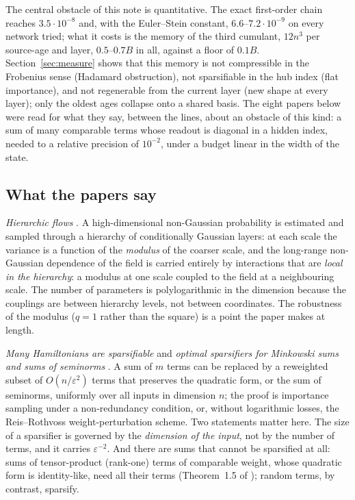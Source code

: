 \label{sec:reading}
The central obstacle of this note is quantitative. The exact first-order chain reaches $3.5\cdot10^{-8}$ and, with
the Euler--Stein constant, $6.6$--$7.2\cdot10^{-9}$ on every network tried; what it costs is the memory of the third
cumulant, $12n^3$ per source-age and layer, $0.5$--$0.7B$ in all, against a floor of $0.1B$. Section~\ref{sec:measure}
shows that this memory is not compressible in the Frobenius sense (Hadamard obstruction), not sparsifiable in the
hub index (flat importance), and not regenerable from the current layer (new shape at every layer); only the
oldest ages collapse onto a shared basis. The eight papers below were read for what they say, between the lines,
about an obstacle of this kind: a sum of many comparable terms whose readout is diagonal in a hidden index, needed
to a relative precision of $10^{-2}$, under a budget linear in the width of the state.

\subsection{What the papers say}
\emph{Hierarchic flows} \cite{LM}. A high-dimensional non-Gaussian probability is estimated and sampled through a
hierarchy of conditionally Gaussian layers: at each scale the variance is a function of the \emph{modulus} of the
coarser scale, and the long-range non-Gaussian dependence of the field is carried entirely by interactions that
are \emph{local in the hierarchy}: a modulus at one scale coupled to the field at a neighbouring scale. The number
of parameters is polylogarithmic in the dimension because the couplings are between hierarchy levels, not between
coordinates. The robustness of the modulus ($q=1$ rather than the square) is a point the paper makes at length.

\emph{Many Hamiltonians are sparsifiable} \cite{BBP} and \emph{optimal sparsifiers for Minkowski sums and sums of
seminorms} \cite{BBCPRZ}. A sum of $m$ terms can be replaced by a reweighted subset of $O(n/\varepsilon^2)$ terms
that preserves the quadratic form, or the sum of seminorms, uniformly over all inputs in dimension $n$; the proof
is importance sampling under a non-redundancy condition, or, without logarithmic losses, the Reis--Rothvoss
weight-perturbation scheme. Two statements matter here. The size of a sparsifier is governed by the
\emph{dimension of the input}, not by the number of terms, and it carries $\varepsilon^{-2}$. And there are sums
that cannot be sparsified at all: sums of tensor-product (rank-one) terms of comparable weight, whose quadratic
form is identity-like, need all their terms (Theorem~1.5 of \cite{BBP}); random terms, by contrast, sparsify.

